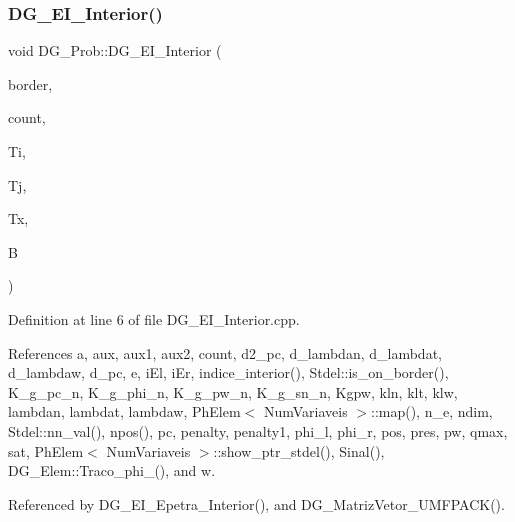 \subsubsection{\texorpdfstring{D\+G\+\_\+\+E\+I\+\_\+\+Interior()}{DG\_EI\_Interior()}\hspace{0.1cm}{\footnotesize\ttfamily [1/2]}}
{\footnotesize\ttfamily void D\+G\+\_\+\+Prob\+::\+D\+G\+\_\+\+E\+I\+\_\+\+Interior (\begin{DoxyParamCaption}\item[{const \hyperlink{structEDGE}{E\+D\+GE}}]{border,  }\item[{int \&}]{count,  }\item[{int $\ast$}]{Ti,  }\item[{int $\ast$}]{Tj,  }\item[{double $\ast$}]{Tx,  }\item[{double $\ast$}]{B }\end{DoxyParamCaption})}



Definition at line 6 of file D\+G\+\_\+\+E\+I\+\_\+\+Interior.\+cpp.



References a, aux, aux1, aux2, count, d2\+\_\+pc, d\+\_\+lambdan, d\+\_\+lambdat, d\+\_\+lambdaw, d\+\_\+pc, e, i\+El, i\+Er, indice\+\_\+interior(), Stdel\+::is\+\_\+on\+\_\+border(), K\+\_\+g\+\_\+pc\+\_\+n, K\+\_\+g\+\_\+phi\+\_\+n, K\+\_\+g\+\_\+pw\+\_\+n, K\+\_\+g\+\_\+sn\+\_\+n, Kgpw, kln, klt, klw, lambdan, lambdat, lambdaw, Ph\+Elem$<$ Num\+Variaveis $>$\+::map(), n\+\_\+e, ndim, Stdel\+::nn\+\_\+val(), npos(), pc, penalty, penalty1, phi\+\_\+l, phi\+\_\+r, pos, pres, pw, qmax, sat, Ph\+Elem$<$ Num\+Variaveis $>$\+::show\+\_\+ptr\+\_\+stdel(), Sinal(), D\+G\+\_\+\+Elem\+::\+Traco\+\_\+phi\+\_(), and w.



Referenced by D\+G\+\_\+\+E\+I\+\_\+\+Epetra\+\_\+\+Interior(), and D\+G\+\_\+\+Matriz\+Vetor\+\_\+\+U\+M\+F\+P\+A\+C\+K().

